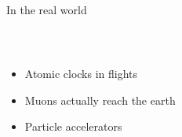 \documentclass{beamer}
\begin{document}
\begin{frame}{In the real world}
  \begin{columns}[t]
    \begin{column}{0.5\textwidth}

      ~\vspace{1.5cm}
      \begin{itemize}
      \item<1->{Atomic clocks in flights} 
      \item<2->{Muons actually reach the earth}
      \item<3->{Particle accelerators}
      \end{itemize}
      ~\vspace{5cm}
      
    \end{column}
    \begin{column}{0.6\textwidth}
      ~\vspace{1cm}\\
      
      
      

\end{column}
\end{columns}
\end{frame}
\end{document}
